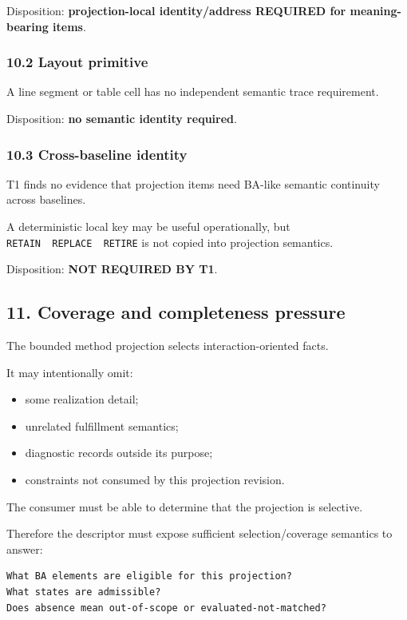 \documentclass[11pt,a4paper]{article}
\providecommand{\tightlist}{\setlength{\itemsep}{0pt}\setlength{\parskip}{0pt}}
\begin{document}
Disposition: \textbf{projection-local identity/address REQUIRED for meaning-bearing items}.

\subsubsection{10.2 Layout primitive}\label{102-layout-primitive}

A line segment or table cell has no independent semantic trace requirement.

Disposition: \textbf{no semantic identity required}.

\subsubsection{10.3 Cross-baseline identity}\label{103-cross-baseline-identity}

T1 finds no evidence that projection items need BA-like semantic continuity across baselines.

A deterministic local key may be useful operationally, but \texttt{RETAIN\ \textbar{}\ REPLACE\ \textbar{}\ RETIRE} is not copied into projection semantics.

Disposition: \textbf{NOT REQUIRED BY T1}.

\subsection{11. Coverage and completeness pressure}\label{11-coverage-and-completeness-pressure}

The bounded method projection selects interaction-oriented facts.

It may intentionally omit:

\begin{itemize}
\tightlist
\item
  some realization detail;
\item
  unrelated fulfillment semantics;
\item
  diagnostic records outside its purpose;
\item
  constraints not consumed by this projection revision.
\end{itemize}

The consumer must be able to determine that the projection is selective.

Therefore the descriptor must expose sufficient selection/coverage semantics to answer:

\begin{verbatim}
What BA elements are eligible for this projection?
What states are admissible?
Does absence mean out-of-scope or evaluated-not-matched?
\end{verbatim}
\end{document}
